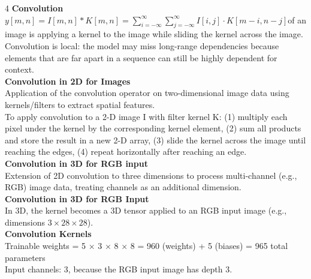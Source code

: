 \documentclass[8pt]{extarticle}
\begin{document}
\begin{multicols}{4}
\vspace{2pt}\textbf{Convolution}\\
$y[m, n] = I[m, n] * K[m, n] = \sum_{i=-\infty}^{\infty} \sum_{j=-\infty}^{\infty} I[i, j] \cdot K[m-i, n-j]$\Convolution of an image is applying a kernel to the image while sliding the kernel across the image.\\
Convolution is local: the model may miss long-range dependencies because elements that are far apart in a sequence can still be highly dependent for context.\\
\vspace{2pt}\textbf{Convolution in 2D for Images}\\
Application of the convolution operator on two-dimensional image data using kernels/filters to extract spatial features.\\
To apply convolution to a 2-D image I with filter kernel K: (1) multiply each pixel under the kernel by the corresponding kernel element, (2) sum all products and store the result in a new 2-D array, (3) slide the kernel across the image until reaching the edges, (4) repeat horizontally after reaching an edge.\\
\vspace{2pt}\textbf{Convolution in 3D for RGB input}\\
Extension of 2D convolution to three dimensions to process multi-channel (e.g., RGB) image data, treating channels as an additional dimension.\\
\vspace{2pt}\textbf{Convolution in 3D for RGB Input}\\
In 3D, the kernel becomes a 3D tensor applied to an RGB input image (e.g., dimensions $3\times28\times28$).\\
\vspace{2pt}\textbf{Convolution Kernels}\\
Trainable weights = 5 $\times$ 3 $\times$ 8 $\times$ 8 = 960 (weights) + 5 (biases) = 965 total parameters\\
Input channels: 3, because the RGB input image has depth 3.\\


\end{multicols}
\end{document}
